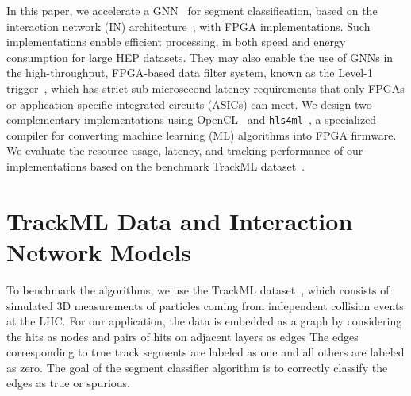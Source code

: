 \documentclass{article}
\newcommand{\hlsfml}{\texttt{hls4ml}\xspace}
\begin{document}
In this paper, we accelerate a GNN~\cite{Ju:2020xty} for segment classification, based on the interaction network (IN) architecture~\cite{Battaglia:2016jem,battaglia2018relational}, with FPGA implementations. 
Such implementations enable efficient processing, in both speed and energy consumption for large HEP datasets.
They may also enable the use of GNNs in the high-throughput, FPGA-based data filter system, known as the Level-1 trigger~\cite{ATLASL1T,ATLASP2L1T,CMSL1T,CMSP2L1T}, which has strict sub-microsecond latency requirements that only FPGAs or application-specific integrated circuits (ASICs) can meet.
We design two complementary implementations using OpenCL~\cite{OpenCL} and \hlsfml~\cite{Duarte:2018ite}, a specialized compiler for converting machine learning (ML) algorithms into FPGA firmware.
We evaluate the resource usage, latency, and tracking performance of our implementations based on the benchmark TrackML dataset~\cite{Amrouche:2019wmx}.

\section{TrackML Data and Interaction Network Models}
\label{sec:in}


To benchmark the algorithms, we use the TrackML dataset~\cite{Amrouche:2019wmx}, which consists of simulated 3D measurements of particles coming from independent collision events at the LHC.
For our application, the data is embedded as a graph by considering the hits as nodes and pairs of hits on adjacent layers as edges
The edges corresponding to true track segments are labeled as one and all others are labeled as zero.
The goal of the segment classifier algorithm is to correctly classify the edges as true or spurious.
\end{document}

